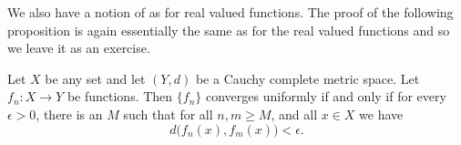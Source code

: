 

We also have a notion of \emph{} as for real
valued functions.  The proof of the following proposition is
again essentially the same as for the real valued functions and so
we leave it as an exercise.

\begin{prop} \label{prop:unifcauchymetric}
Let $X$ be any set and let $(Y,d)$ be a Cauchy complete metric space.
Let $f_n \colon X \to Y$ be functions.  Then $\{ f_n \}$ converges
uniformly if and only if for every $\epsilon > 0$, there is an $M$ such that
for all $n, m \geq M$, and all $x \in X$ we have
\begin{equation*}
d\bigl(f_n(x),f_m(x)\bigr) < \epsilon .
\end{equation*}
\end{prop}

%
%

